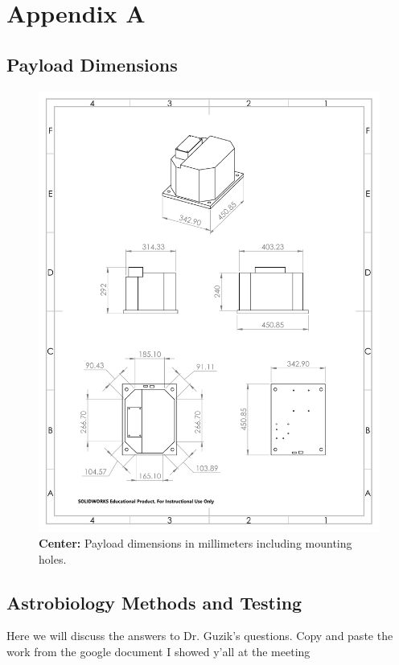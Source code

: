 \newpage
\section{Appendix A}
\label{sec:Appendix A}

\subsection{Payload Dimensions}
\begin{figure}[!h]
\begin{center}
\includegraphics[scale=.7]{./Figures/Payload_Dim.pdf}
\caption{{\bf Center:} Payload dimensions in millimeters including mounting holes.}
\label{fig:payload_dim}
\end{center}
\end{figure}

\subsection{Astrobiology Methods and Testing}

Here we will discuss the answers to Dr. Guzik's questions.
Copy and paste the work from the google document I showed y'all at the meeting
